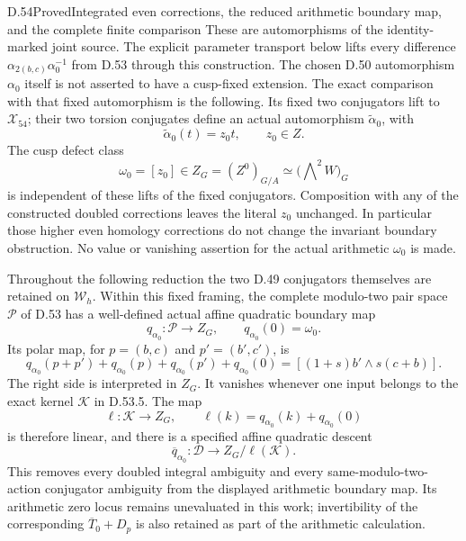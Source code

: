 \begin{statement}{D.54}{Proved}{Integrated even corrections, the reduced arithmetic boundary map, and the complete finite comparison}
These are automorphisms of the identity-marked
joint source. The explicit parameter transport
below lifts every difference
\(\alpha_{2(b,c)}\alpha_0^{-1}\) from D.53
through this construction. The chosen D.50
automorphism \(\alpha_0\) itself is not
asserted to have a cusp-fixed extension.
The exact comparison with that fixed
automorphism is the following. Its fixed two
conjugators lift to \(\mathcal X_{54}\);
their two torsion conjugates define an actual
automorphism \(\widetilde\alpha_0\), with
\[
             \widetilde\alpha_0(t)=z_0t,\qquad z_0\in Z .
 \tag{D.54.4}
\]
The cusp defect class
\[
       \omega_0=[z_0]\in Z_G
           =(Z^0)_{G/A}
           \simeq
              \bigl(\bigwedge\nolimits^2 W\bigr)_G
 \tag{D.54.5}
\]
is independent of these lifts of the fixed
conjugators. Composition with any of the
constructed doubled corrections leaves the
literal \(z_0\) unchanged. In particular
those higher even homology corrections do
not change the invariant boundary obstruction.
No value or vanishing assertion for the
actual arithmetic \(\omega_0\) is made.

Throughout the following reduction the
two D.49 conjugators themselves are retained
on \(\mathcal W_h\). Within this fixed framing,
the complete modulo-two pair space
\(\mathcal P\) of D.53 has a well-defined
actual affine quadratic boundary map
\[
 q_{\alpha_0}:\mathcal P\longrightarrow Z_G,
       \qquad q_{\alpha_0}(0)=\omega_0 .
 \tag{D.54.6}
\]
Its polar map, for \(p=(b,c)\) and
\(p'=(b',c')\), is
\[
 q_{\alpha_0}(p+p')+q_{\alpha_0}(p)
       +q_{\alpha_0}(p')+q_{\alpha_0}(0)
       =[(1+s)b'\wedge s(c+b)] .
 \tag{D.54.7}
\]
The right side is interpreted in \(Z_G\).
It vanishes whenever one input belongs to
the exact kernel \(\mathcal K\) in D.53.5.
The map
\[
 \ell:\mathcal K\longrightarrow Z_G,\qquad
     \ell(k)=q_{\alpha_0}(k)+q_{\alpha_0}(0)
 \tag{D.54.8}
\]
is therefore linear, and there is a specified
affine quadratic descent
\[
 \overline q_{\alpha_0}:\mathscr D
           \longrightarrow Z_G/\ell(\mathcal K).
 \tag{D.54.9}
\]
This removes every doubled integral
ambiguity and every same-modulo-two-action
conjugator ambiguity from the displayed
arithmetic boundary map. Its arithmetic
zero locus remains unevaluated in this work;
invertibility of the corresponding
\(\overline T_0+D_p\) is also retained
as part of the arithmetic calculation.


\end{statement}
